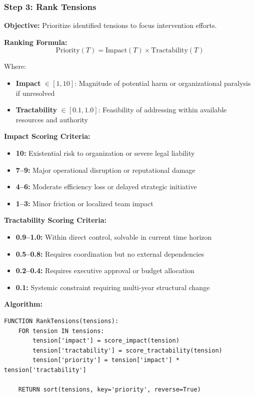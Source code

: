 \documentclass[11pt,a4paper]{article}
\begin{document}
\subsubsection{Step 3: Rank Tensions}

\textbf{Objective:} Prioritize identified tensions to focus intervention efforts.

\textbf{Ranking Formula:}
\begin{equation}
\text{Priority}(T) = \text{Impact}(T) \times \text{Tractability}(T)
\end{equation}

Where:
\begin{itemize}
\item \textbf{Impact} $\in [1, 10]$: Magnitude of potential harm or organizational paralysis if unresolved
\item \textbf{Tractability} $\in [0.1, 1.0]$: Feasibility of addressing within available resources and authority
\end{itemize}

\textbf{Impact Scoring Criteria:}
\begin{itemize}
\item \textbf{10:} Existential risk to organization or severe legal liability
\item \textbf{7--9:} Major operational disruption or reputational damage
\item \textbf{4--6:} Moderate efficiency loss or delayed strategic initiative
\item \textbf{1--3:} Minor friction or localized team impact
\end{itemize}

\textbf{Tractability Scoring Criteria:}
\begin{itemize}
\item \textbf{0.9--1.0:} Within direct control, solvable in current time horizon
\item \textbf{0.5--0.8:} Requires coordination but no external dependencies
\item \textbf{0.2--0.4:} Requires executive approval or budget allocation
\item \textbf{0.1:} Systemic constraint requiring multi-year structural change
\end{itemize}

\textbf{Algorithm:}
\begin{verbatim}
FUNCTION RankTensions(tensions):
    FOR tension IN tensions:
        tension['impact'] = score_impact(tension)
        tension['tractability'] = score_tractability(tension)
        tension['priority'] = tension['impact'] * tension['tractability']
    
    RETURN sort(tensions, key='priority', reverse=True)
\end{verbatim}
\end{document}
